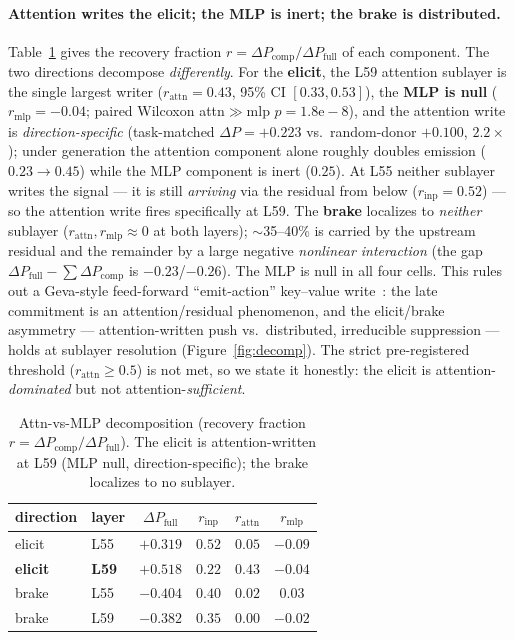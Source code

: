 \paragraph{Attention writes the elicit; the MLP is inert; the brake is distributed.}
Table~\ref{tab:decomp} gives the recovery fraction $r = \Delta P_{\text{comp}}/\Delta P_{\text{full}}$ of each
component. The two directions decompose \emph{differently}. For the \textbf{elicit}, the L59 attention sublayer
is the single largest writer ($r_{\text{attn}}{=}0.43$, 95\% CI $[0.33,0.53]$), the \textbf{MLP is null}
($r_{\text{mlp}}{=}{-}0.04$; paired Wilcoxon attn$\gg$mlp $p{=}1.8\mathrm{e}{-}8$), and the attention write is
\emph{direction-specific} (task-matched $\Delta P{=}{+}0.223$ vs.\ random-donor $+0.100$, $2.2\times$); under
generation the attention component alone roughly doubles emission ($0.23\!\to\!0.45$) while the MLP component is
inert ($0.25$). At L55 neither sublayer writes the signal --- it is still \emph{arriving} via the residual from
below ($r_{\text{inp}}{=}0.52$) --- so the attention write fires specifically at L59. The \textbf{brake} localizes
to \emph{neither} sublayer ($r_{\text{attn}},r_{\text{mlp}}\!\approx\!0$ at both layers); $\sim$35--40\% is
carried by the upstream residual and the remainder by a large negative \emph{nonlinear interaction} (the gap
$\Delta P_{\text{full}}-\sum\Delta P_{\text{comp}}$ is $-0.23$/$-0.26$). The MLP is null in all four cells. This
rules out a Geva-style feed-forward ``emit-action'' key--value write~\cite{geva}: the late commitment is an
attention/residual phenomenon, and the elicit/brake asymmetry --- attention-written push vs.\ distributed,
irreducible suppression --- holds at sublayer resolution (Figure~\ref{fig:decomp}). The strict pre-registered
threshold ($r_{\text{attn}}{\ge}0.5$) is not met, so we state it honestly: the elicit is attention-\emph{dominated}
but not attention-\emph{sufficient}.

\begin{table}[h]\centering\small
\begin{tabular}{llcccc}
\toprule
direction & layer & $\Delta P_{\text{full}}$ & $r_{\text{inp}}$ & $r_{\text{attn}}$ & $r_{\text{mlp}}$ \\
\midrule
elicit & L55 & $+0.319$ & $0.52$ & $0.05$ & $-0.09$ \\
\textbf{elicit} & \textbf{L59} & $+0.518$ & $0.22$ & $\mathbf{0.43}$ & $-0.04$ \\
brake & L55 & $-0.404$ & $0.40$ & $0.02$ & $0.03$ \\
brake & L59 & $-0.382$ & $0.35$ & $0.00$ & $-0.02$ \\
\bottomrule
\end{tabular}
\caption{Attn-vs-MLP decomposition (recovery fraction $r=\Delta P_{\text{comp}}/\Delta P_{\text{full}}$). The
elicit is attention-written at L59 (MLP null, direction-specific); the brake localizes to no sublayer.}
\label{tab:decomp}
\end{table}

